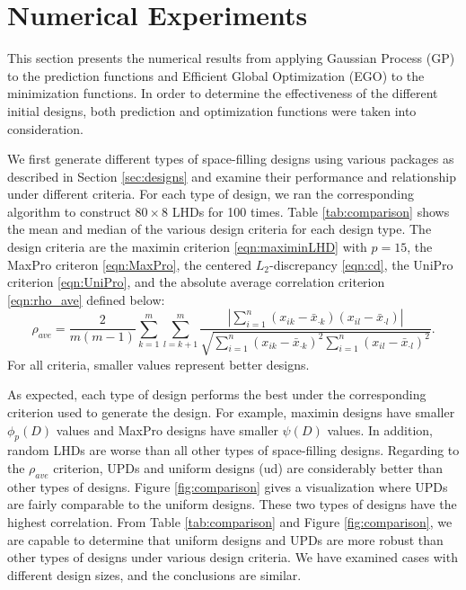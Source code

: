 \documentclass [PhD] {package/uclathes}
\begin{document}
\clearpage
\section{Numerical Experiments}\label{numerical-experiments}
This section presents the numerical results from applying Gaussian Process (GP) to the prediction functions and Efficient Global Optimization (EGO) to the minimization functions. In order to determine the effectiveness of the different initial designs, both prediction and optimization functions were taken into consideration.

We first generate different types of space-filling designs using various packages as described in Section \ref{sec:designs} and examine their performance and relationship under different criteria. For each type of design, we ran the corresponding algorithm to construct $80\times 8$ LHDs for 100 times. Table \ref{tab:comparison} shows the mean and median of the various design criteria for each design type.
The design criteria are the maximin criterion \eqref{eqn:maximinLHD} with $p=15$, the MaxPro criteron \eqref{eqn:MaxPro}, the centered $L_2$-discrepancy \eqref{eqn:cd}, the UniPro criterion \eqref{eqn:UniPro}, and the absolute average correlation criterion \eqref{eqn:rho_ave}  defined below:
\begin{equation}\label{eqn:rho_ave}
\rho_{ave} =\frac{2}{m(m-1)}\sum_{k = 1}^m\sum_{l = k+1}^m\frac{\left|\sum_{i=1}^n\left(x_{ik}-\bar{x}_{\cdot k}\right)\left(x_{il}-\bar{x}_{\cdot l}\right)\right|}{\sqrt{\sum_{i=1}^n\left(x_{ik}-\bar{x}_{\cdot k}\right)^2 \sum_{i=1}^n\left(x_{il} -\bar{x}_{\cdot l}\right)^2}}.
\end{equation}
For all criteria, smaller values represent better designs.

As expected, each type of design performs the best under the corresponding criterion used to generate the design. For example, maximin designs have smaller $\phi_p(D)$ values and MaxPro designs have smaller $\psi(D)$ values. In addition, random LHDs are worse than all other types of space-filling designs.
Regarding to the $\rho_{ave}$ criterion, UPDs and uniform designs (ud) are considerably better than other types of designs.
 Figure \ref{fig:comparison} gives a visualization where UPDs are fairly comparable to the uniform designs. These two types of designs have the highest correlation. From Table \ref{tab:comparison} and Figure \ref{fig:comparison}, we are capable to determine that uniform designs and UPDs are more robust than other types of designs under various design criteria.
 We have examined cases with different design sizes, and the conclusions are similar.
\end{document}
